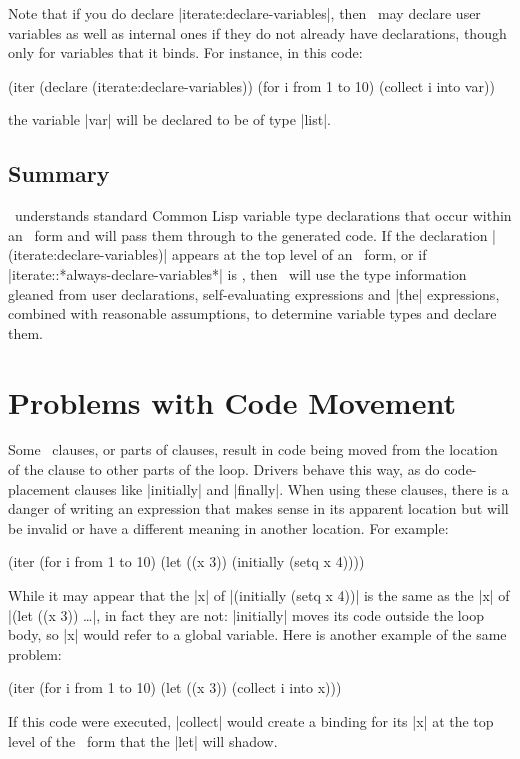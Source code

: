 Note that if you do declare |iterate:declare-variables|, then
\iter\ may declare user variables as well as internal ones if they do
not already have declarations, though only for variables that it
binds.  For instance, in this code:

\begin{program}
(iter (declare (iterate:declare-variables))
      (for i from 1 to 10)
      (collect i into var))
\end{program}
the variable |var| will be declared to be of type |list|.


\subsection{Summary}

\iter\ understands standard Common Lisp variable type declarations
that occur within an \iter\ form and
will pass them through to the generated code.  If the declaration
|(iterate:declare-variables)|
appears at the top level of an 
\iter\ form, or if 
|iterate::*always-declare-variables*| 
is \nonnil, then \iter\ will use the type information gleaned from user
declarations, self-evaluating expressions and |the| expressions,
combined with reasonable assumptions, to determine variable
types and declare them.


\section{Problems with Code Movement}
\label{code-movement}

Some \iter\ clauses, or parts of clauses, result in code being
moved from the location of the clause to other parts of the loop.
Drivers behave this way, as do code-placement clauses like |initially|
and |finally|.  When using these clauses, there is a danger of writing
an expression that makes sense in its apparent location but will be
invalid or have a different meaning in another location.  For example:
\begin{program}
(iter (for i from 1 to 10)
      (let ((x 3))
        (initially (setq x 4))))
\end{program}
While it may appear that the |x| of |(initially (setq x 4))| is the
same as the |x| of |(let ((x 3)) \dots|, in fact they are not:
|initially| moves its code outside the loop body, so |x| would refer
to a global variable.  Here is another example of the same problem:
\begin{program}
(iter (for i from 1 to 10)
      (let ((x 3))
        (collect i into x)))
\end{program}
If this code were executed, |collect| would create a binding for its
|x| at the top level of the \iter\ form that the |let| will shadow.

